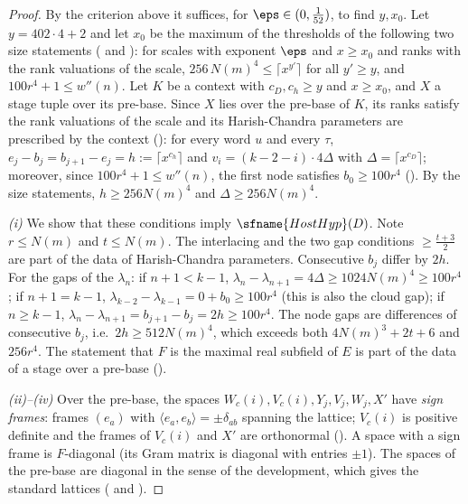 \begin{proof}
By the criterion above it suffices, for $\eps\in(0,\frac1{52})$, to find $y,x_0$. Let $y=402\cdot4+2$ and let $x_0$ be the maximum of
the thresholds of the following two size statements ( and ):
for scales with exponent $\eps$ and $x\ge x_0$ and ranks with the rank valuations of the scale, $256\,N(m)^4\le\lceil x^{y'}\rceil$ for all
$y'\ge y$, and $100r^4+1\le w''(n)$. Let $K$ be a context with $c_D,c_h\ge y$ and $x\ge x_0$, and $X$ a stage tuple over its pre-base. Since
$X$ lies over the pre-base of $K$, its ranks satisfy the rank valuations of the scale and its Harish-Chandra parameters are prescribed
by the context (): for every word $u$ and every $\tau$, $e_j-b_j=b_{j+1}-e_j=h:=\lceil
x^{c_h}\rceil$ and $v_i=(k-2-i)\cdot4\Delta$ with $\Delta=\lceil x^{c_D}\rceil$; moreover, since $100r^4+1\le w''(n)$, the first node satisfies $b_0\ge100r^4$
(). By the size statements, $h\ge256N(m)^4$ and $\Delta\ge256N(m)^4$.

\emph{(i)} We show that these conditions imply $\sfname{HostHyp}(D)$. Note $r\le N(m)$ and $t\le N(m)$. The interlacing and the two gap
conditions $\ge\frac{t+3}2$ are part of the data of Harish-Chandra parameters. Consecutive $b_j$ differ by $2h$. For the gaps of the
$\lambda_n$: if $n+1<k-1$, $\lambda_n-\lambda_{n+1}=4\Delta\ge1024N(m)^4\ge100r^4$; if $n+1=k-1$, $\lambda_{k-2}-\lambda_{k-1}=0+b_0\ge100r^4$ (this
is also the cloud gap); if $n\ge k-1$, $\lambda_n-\lambda_{n+1}=b_{j+1}-b_j=2h\ge100r^4$. The node gaps are differences of consecutive $b_j$,
i.e.\ $2h\ge512N(m)^4$, which exceeds both $4N(m)^3+2t+6$ and $256r^4$. The statement that $F$ is the maximal real subfield of $E$ is
part of the data of a stage over a pre-base ().

\emph{(ii)--(iv)} Over the pre-base, the spaces $W_c(i),V_c(i),Y_j,V_j,W_j,X'$ have \emph{sign frames}: frames $(e_a)$ with
$\langle e_a,e_b\rangle=\pm\delta_{ab}$ spanning the lattice; $V_c(i)$ is positive definite and the frames of $V_c(i)$ and $X'$ are
orthonormal (). A space with a sign frame is $F$-diagonal (its Gram matrix is
diagonal with entries $\pm1$). The spaces of the pre-base are diagonal in the sense of the development, which gives the standard
lattices ( and ).
\end{proof}

